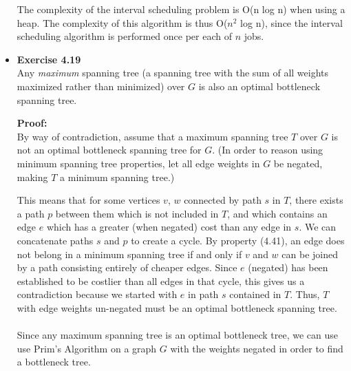 \documentclass[a4paper]{article}
\begin{document}
\begin{itemize}
The complexity of the interval scheduling problem is O(n log n) when using a heap. The complexity of this algorithm is thus O($n^2$ log n), since the interval scheduling algorithm is performed once per each of $n$ jobs.

\item{\textbf{Exercise 4.19}} \\
Any \emph{maximum} spanning tree (a spanning tree with the sum of all weights maximized rather than minimized) over $G$ is also an optimal bottleneck spanning tree.

\textbf{Proof:} \\
By way of contradiction, assume that a maximum spanning tree $T$ over $G$ is not an optimal bottleneck spanning tree for $G$. (In order to reason using minimum spanning tree properties, let all edge weights in $G$ be negated, making $T$ a minimum spanning tree.)

This means that for some vertices $v$, $w$ connected by path $s$ in $T$, there exists a path $p$ between them which is not included in $T$, and which contains an edge $e$ which has a greater (when negated) cost than any edge in $s$. We can concatenate paths $s$ and $p$ to create a cycle. By property (4.41), an edge does not belong in a minimum spanning tree if and only if $v$ and $w$ can be joined by a path consisting entirely of cheaper edges. Since $e$ (negated) has been established to be costlier than all edges in that cycle, this gives us a contradiction because we started with $e$ in path $s$ contained in $T$. Thus, $T$ with edge weights un-negated must be an optimal bottleneck spanning tree. \\
\\
Since any maximum spanning tree is an optimal bottleneck tree, we can use use Prim's Algorithm on a graph $G$ with the weights negated in order to find a bottleneck tree. \\ \\


\end{itemize}
\end{document}
